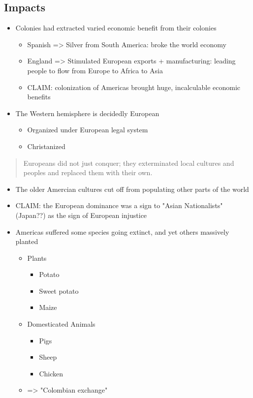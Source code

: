 \documentclass[letterpaper]{article}
\begin{document}
\subsection{Impacts}
\label{sec:orgd6c25e9}
\begin{itemize}
\item Colonies had extracted varied economic benefit from their colonies

\begin{itemize}
\item Spanish => Silver from South America: broke the world economy
\item England => Stimulated European exports + manufacturing: leading
people to flow from Europe to Africa to Asia
\item CLAIM: colonization of Americas brought huge, incalculable economic
benefits
\end{itemize}

\item The Western hemisphere is decidedly European

\begin{itemize}
\item Organized under European legal system
\item Christanized
\end{itemize}
\end{itemize}

\begin{quote}
Europeans did not just conquer; they exterminated local cultures and
peoples and replaced them with their own.
\end{quote}

\begin{itemize}
\item The older Amercian cultures cut off from populating other parts of the
world
\item CLAIM: the European dominance was a sign to "Asian Nationalists"
(Japan??) as the sign of European injustice
\item Americas suffered some species going extinct, and yet others massively
planted

\begin{itemize}
\item Plants

\begin{itemize}
\item Potato
\item Sweet potato
\item Maize
\end{itemize}

\item Domesticated Animals

\begin{itemize}
\item Pigs
\item Sheep
\item Chicken
\end{itemize}

\item => "Colombian exchange"
\end{itemize}
\end{itemize}
\end{document}
